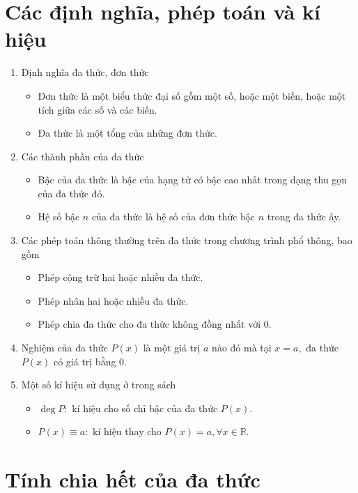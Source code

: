 \section*{Các định nghĩa, phép toán và kí hiệu}
\begin{enumerate}
    \item Định nghĩa đa thức, đơn thức
    \begin{itemize}
        \item Đơn thức là một biểu thức đại số gồm một số, hoặc một biến, hoặc một tích giữa các số và các biến.
        \item Đa thức là một tổng của những đơn thức.
    \end{itemize}
    \item Các thành phần của đa thức
    \begin{itemize}
        \item Bậc của đa thức là bậc của hạng tử có bậc cao nhất trong dạng thu gọn của đa thức đó.
        \item Hệ số bậc $n$ của đa thức là hệ số của đơn thức bậc $n$ trong đa thức ấy.    
    \end{itemize}
    \item Các phép toán thông thường trên đa thức trong chương trình phổ thông, bao gồm
    \begin{itemize}
        \item Phép cộng trừ hai hoặc nhiều đa thức.
        \item Phép nhân hai hoặc nhiều đa thức.
        \item Phép chia đa thức cho đa thức không đồng nhất với $0.$
    \end{itemize}
    \item Nghiệm của đa thức $P(x)$ là một giá trị $a$ nào đó mà tại $x=a,$ đa thức $P(x)$ có giá trị bằng $0.$ 
    \item Một số kí hiệu sử dụng ở trong sách
    \begin{itemize}
        \item $\deg P:$ kí hiệu cho số chỉ bậc của đa thức $P(x).$
        \item $P(x)\equiv a:$ kí hiệu thay cho $P(x)=a,\forall x\in \mathbb{R}.$
    \end{itemize}
\end{enumerate}

\section{Tính chia hết của đa thức}

